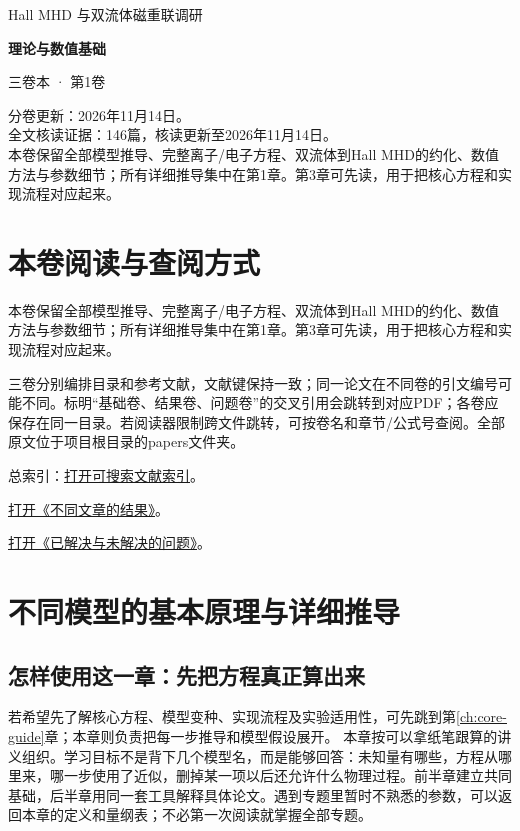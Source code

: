 \documentclass[UTF8,a4paper,11pt,openany,fontset=fandol]{ctexbook}
\begin{document}
\frontmatter\begin{titlepage}\vspace*{22mm}
{\sffamily\Large Hall MHD 与双流体磁重联调研\par}\vspace{14mm}
{\sffamily\Huge\bfseries\color{ink}理论与数值基础\par}\vspace{10mm}
{\sffamily\large 三卷本 · 第1卷\par}\vfill
分卷更新：2026年11月14日。\\[5pt]
全文核读证据：146篇，核读更新至2026年11月14日。\\[5pt]
本卷保留全部模型推导、完整离子/电子方程、双流体到Hall MHD的约化、数值方法与参数细节；所有详细推导集中在第1章。第3章可先读，用于把核心方程和实现流程对应起来。
\end{titlepage}\chapter*{本卷阅读与查阅方式}
本卷保留全部模型推导、完整离子/电子方程、双流体到Hall MHD的约化、数值方法与参数细节；所有详细推导集中在第1章。第3章可先读，用于把核心方程和实现流程对应起来。

三卷分别编排目录和参考文献，文献键保持一致；同一论文在不同卷的引文编号可能不同。标明“基础卷、结果卷、问题卷”的交叉引用会跳转到对应PDF；各卷应保存在同一目录。若阅读器限制跨文件跳转，可按卷名和章节/公式号查阅。全部原文位于项目根目录的papers文件夹。

总索引：\href{run:../paper_index.html}{打开可搜索文献索引}。
\par\href{run:02_paper_results.pdf}{打开《不同文章的结果》}。
\par\href{run:03_solved_open.pdf}{打开《已解决与未解决的问题》}。
\tableofcontents\mainmatter
\chapter{不同模型的基本原理与详细推导}\label{ch:models}
\section{怎样使用这一章：先把方程真正算出来}
\label{sec:tutorial-start}
若希望先了解核心方程、模型变种、实现流程及实验适用性，可先跳到第\ref{ch:core-guide}章；本章则负责把每一步推导和模型假设展开。
本章按可以拿纸笔跟算的讲义组织。学习目标不是背下几个模型名，而是能够回答：未知量有哪些，方程从哪里来，哪一步使用了近似，删掉某一项以后还允许什么物理过程。前半章建立共同基础，后半章用同一套工具解释具体论文。遇到专题里暂时不熟悉的参数，可以返回本章的定义和量纲表；不必第一次阅读就掌握全部专题。
\end{document}
